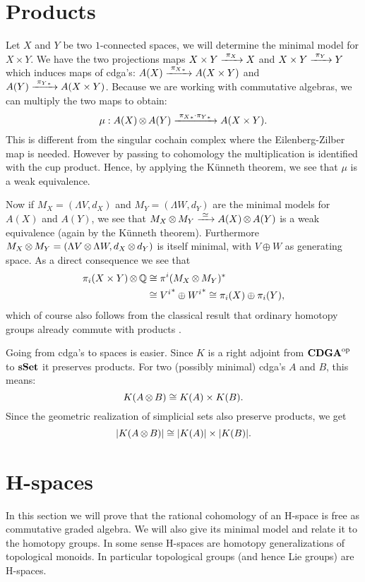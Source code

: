 \section{Products}
Let $X$ and $Y$ be two $1$-connected spaces, we will determine the minimal model for $X \times Y$. We have the two projections maps $X \times Y \xrightarrow{\,\,{\pi_X}\,\,} X$ and $X \times Y \xrightarrow{\,\,{\pi_Y}\,\,} Y$ which induces maps of cdga's: $A(X) \xrightarrow{\,\,{{\pi_X}_\ast}\,\,} A(X \times Y)$ and $A(Y) \xrightarrow{\,\,{{\pi_Y}_\ast}\,\,} A(X \times Y)$. Because we are working with commutative algebras, we can multiply the two maps to obtain:
$$ \mu: A(X) \operatorname*{\otimes} A(Y) \xrightarrow{\,\,{{\pi_X}_\ast \cdot {\pi_Y}_\ast}\,\,} A(X \times Y). $$
This is different from the singular cochain complex where the Eilenberg-Zilber map is needed. However by passing to cohomology the multiplication is identified with the cup product. Hence, by applying the Künneth theorem, we see that $\mu$ is a weak equivalence.

Now if $M_X = (\Lambda V, d_X)$ and $M_Y = (\Lambda W, d_Y)$ are the minimal models for $A(X)$ and $A(Y)$, we see that $M_X \operatorname*{\otimes} M_Y \xrightarrow{\,\,{\simeq}\,\,} A(X) \operatorname*{\otimes} A(Y)$ is a weak equivalence (again by the Künneth theorem). Furthermore $M_X \operatorname*{\otimes} M_Y = (\Lambda V \operatorname*{\otimes} \Lambda W, d_X \operatorname*{\otimes} d_Y)$ is itself minimal, with $V \oplus W$ as generating space. As a direct consequence we see that
\begin{align*}
	\pi_i(X \times Y) \operatorname*{\otimes} \mathbb{Q} &\cong \pi^i(M_X \operatorname*{\otimes} M_Y)^\ast \\
		&\cong {V^i}^\ast \oplus {W^i}^\ast \cong \pi_i(X) \oplus \pi_i(Y),
\end{align*}
which of course also follows from the classical result that ordinary homotopy groups already commute with products \cite{may}.

Going from cdga's to spaces is easier. Since $K$ is a right adjoint from ${\mathbf{CDGA}}^{\text{op}}$ to $\mathbf{s{\mathbf{Set}}}$ it preserves products. For two (possibly minimal) cdga's $A$ and $B$, this means:
$$ K(A \operatorname*{\otimes} B) \cong K(A) \times K(B). $$
Since the geometric realization of simplicial sets also preserve products, we get
$$ |K(A \operatorname*{\otimes} B)| \cong |K(A)| \times |K(B)|. $$


\section{H-spaces}
In this section we will prove that the rational cohomology of an H-space is free as commutative graded algebra. We will also give its minimal model and relate it to the homotopy groups. In some sense H-spaces are homotopy generalizations of topological monoids. In particular topological groups (and hence Lie groups) are H-spaces.

